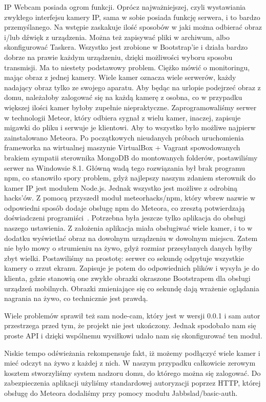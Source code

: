 \documentclass[brudnopis]{xmgr}
\begin{document}
IP Webcam posiada ogrom funkcji. Oprócz najważniejszej, czyli wystawiania zwykłego interfejsu kamery IP, sama w sobie posiada funkcję serwera, i to bardzo przemyślanego. Na wstępie zaskakuje ilość sposobów w jaki można odbierać obraz i/lub dźwięk z urządzenia. Można też zapisywać pliki w archiwum, albo skonfigurować Taskera. Wszystko jest zrobione w Bootstrap'ie i działa bardzo dobrze na prawie każdym urządzeniu, dzięki możliwości wyboru sposobu transmisji.
Ma to niestety podstawowy problem. Ciężko mówić o monitoringu, mając obraz z jednej kamery. Wiele kamer oznacza wiele serwerów, każdy nadający obraz tylko ze swojego aparatu. Aby będąc na urlopie podejrzeć obraz z domu, należałoby zalogować się na każdą kamerę z osobna, co w przypadku większej ilości kamer byłoby zupełnie niepraktyczne. Zaprogramowaliśmy serwer w technologii Meteor, który odbiera sygnał z wielu kamer, inaczej, zapisuje migawki do pliku i serwuje je klientowi.
Aby to wszystko było możliwe najpierw zainstalowano Meteora. Po początkowych nieudanych próbach uruchomienia frameworka na wirtualnej maszynie VirtualBox + Vagrant spowodowanych brakiem sympatii sterownika MongoDB do montowanych folderów, postawiliśmy serwer na Windowsie 8.1. Główną wadą tego rozwiązania był brak programu npm, co stanowiło spory problem, gdyż najlepszy naszym zdaniem sterownik do kamer IP jest modułem Node.js. Jednak wszystko jest możliwe z odrobiną hacks'ów. Z pomocą przyszedł moduł meteorhacks/npm, który wbrew nazwie w odpowiedni sposób dodaje obsługę npm do Meteora, co zresztą potwierdzają doświadczeni programiści~\cite{Npm:2014:CMC}.
Potrzebna była jeszcze tylko aplikacja do obsługi naszego ustawienia. Z założenia aplikacja miała obsługiwać wiele kamer, i to w dodatku wyświetlać obraz na dowolnym urządzeniu w dowolnym miejscu. Zatem nie było mowy o strumieniu na żywo, gdyż rozmiar przesyłanych danych byłby zbyt wielki. Postawiliśmy na prostotę: serwer co sekundę odpytuje wszystkie kamery o zrzut ekranu. Zapisuje je potem do odpowiednich plików i wysyła je do klienta, gdzie stanowią one zwykłe obrazki okraszone Bootstrapem dla obsługi urządzeń mobilnych. Obrazki zmieniające się co sekundę dają wrażenie oglądania nagrania na żywo, co technicznie jest prawdą.

Wiele problemów sprawił też sam node-cam, który jest w wersji 0.0.1 i sam autor przestrzega przed tym, że projekt nie jest ukończony. Jednak spodobało nam się proste API i dzięki wspólnemu wysiłkowi udało nam się skonfigurować ten moduł.

Niskie tempo odświeżania rekompensuje fakt, iż możemy podłączyć wiele kamer i mieć odczyt na żywo z każdej z nich. W naszym przypadku całkowicie zerowym kosztem stworzyliśmy system nadzoru domu, do którego można się zalogować. Do zabezpieczenia aplikacji użyliśmy standardowej autoryzacji poprzez HTTP, której obsługę do Meteora dodaliśmy przy pomocy modułu Jabbslad/basic-auth.
\end{document}
